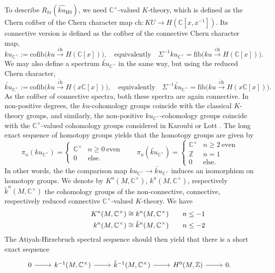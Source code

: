 \documentclass[a4paper]{book}
\newcommand{\bC}{\mathbb{C}}
\newcommand{\bZ}{\mathbb{Z}}
\newcommand{\ch}{\mathrm{ch}}
\theoremstyle{definition}
\theoremstyle{remark}
\numberwithin{equation}{section}
\begin{document}
To describe $R_{hi}(\widehat{ku}_{\mathrm{HS}})$, we need $\bC^\times$-valued $K$-theory, which is defined as the Chern cofiber of the Chern character map $\ch : KU \to H(\bC[x, x^{-1}])$. Its connective version is defined as the cofiber of the connective Chern character map,
\[
ku_{\bC^\times} := \mathrm{cofib}\bigl(ku \stackrel{\ch}{\longrightarrow} H(\bC[x])\bigr), \quad \text{equivalently}
\quad
\Sigma^{-1} ku_{\bC^\times} = \mathrm{fib}\bigl(ku \stackrel{\ch}{\longrightarrow} H(\bC[x])\bigr).
\]
We may also define a spectrum $\widetilde{ku}_{\bC^\times}$ in the same way, but using the reduced Chern character, 
\[
\widetilde{ku}_{\bC^\times} := \mathrm{cofib}\bigl(ku \stackrel{\widetilde{\ch}}{\longrightarrow} H(x\bC[x])\bigr), \quad \text{equivalently}
\quad
\Sigma^{-1} \widetilde{ku}_{\bC^\times} = \mathrm{fib}\bigl(ku \stackrel{\widetilde{\ch}}{\longrightarrow} H(x\bC[x])\bigr).
\]
As the cofiber of connective spectra, both these spectra are again connective. In non-positive degrees, the $ku$-cohomology groups coincide with the classical $K$-theory groups, and similarly, the non-positive $ku_{\bC^\times}$-cohomology groups coincide with the $\bC^\times$-valued cohomology groups considered in Karoubi \cite{karoubi1987cyclichomology} or Lott \cite{lott1994rzindextheory}. The long exact sequence of homotopy groups yields that the homotopy groups are given by
\[
\pi_n(ku_{\bC^\times}) = \begin{cases}
 \bC^\times	& n \geq 0 ~\text{even}
 \\
 0 & \text{else}.
 \end{cases}
 \qquad
 \pi_n(\widetilde{ku}_{\bC^\times}) = \begin{cases}
 \bC^\times	& n \geq 2 ~\text{even}
 \\
 \bZ & n=1
 \\
 0 & \text{else}.
 \end{cases}
\]
In other words, the the comparison map $ku_{\bC^\times} \to \widetilde{ku}_{\bC^\times}$ induces an isomorphism on homotopy groups. We denote by $K^n(M, \bC^\times)$, $k^n(M, \bC^\times)$, respectively $\tilde{k}^n(M, \bC^\times)$ the cohomology groups of the non-connective, connective, respectively reduced connective $\bC^\times$-valued $K$-theory. We have
\begin{align*}
K^n(M, \bC^\times) \cong k^n(M, \bC^\times)\rlap{\qquad$n\leq -1$}
\\ k^n(M, \bC^\times) \cong \tilde{k}^n(M, \bC^\times) \rlap{\qquad$n\leq -2$}
\end{align*}
The Atiyah-Hirzebruch spectral sequence should then yield that there is a short exact sequence
\[
\begin{tikzcd}
0
\ar[r]
&
k^{-1}(M, \bC^\times)	
\ar[r]
&
\tilde{k}^{-1}(M, \bC^\times) \ar[r] 
& 
H^0(M, \bZ)
\ar[r]
&
0.
\end{tikzcd}
\]
\end{document}

